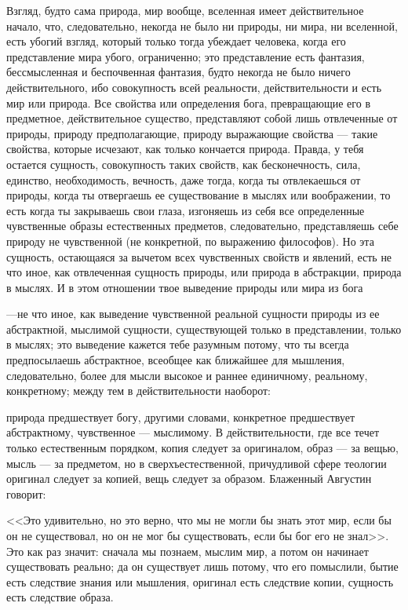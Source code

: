 \documentclass[12pt]{article}
\begin{document}
Взгляд, будто сама природа, мир вообще, вселенная имеет действительное начало, что, следовательно, некогда не было ни природы, ни мира, ни вселенной, есть убогий взгляд, который только тогда убеждает человека, когда его представление мира убого, ограниченно; это представление есть фантазия, бессмысленная и беспочвенная фантазия, будто некогда не было ничего действительного, ибо совокупность всей реальности, действительности и есть мир или природа. Все свойства или определения бога, превращающие его в предметное, действительное существо, представляют собой лишь отвлеченные от природы, природу предполагающие, природу выражающие свойства --- такие свойства, которые исчезают, как только кончается природа. Правда, у тебя остается сущность, совокупность таких свойств, как бесконечность, сила, единство, необходимость, вечность, даже тогда, когда ты отвлекаешься от природы, когда ты отвергаешь ее существование в мыслях или воображении, то есть когда ты закрываешь свои глаза, изгоняешь из себя все определенные чувственные образы естественных предметов, следовательно, представляешь себе природу не чувственной (не конкретной, по выражению философов). Но эта сущность, остающаяся за вычетом всех чувственных свойств и явлений, есть не что иное, как отвлеченная сущность природы, или природа в абстракции, природа в мыслях. И в этом отношении твое выведение природы или мира из бога

---не что иное, как выведение чувственной реальной сущности природы из ее абстрактной, мыслимой сущности, существующей только в представлении, только в мыслях; это выведение кажется тебе разумным потому, что ты всегда предпосылаешь абстрактное, всеобщее как ближайшее для мышления, следовательно, более для мысли высокое и раннее единичному, реальному, конкретному; между тем в действительности наоборот:

природа предшествует богу, другими словами, конкретное предшествует абстрактному, чувственное --- мыслимому. В действительности, где все течет только естественным порядком, копия следует за оригиналом, образ --- за вещью, мысль --- за предметом, но в сверхъестественной, причудливой сфере теологии оригинал следует за копией, вещь следует за образом. Блаженный Августин говорит:

<<Это удивительно, но это верно, что мы не могли бы знать этот мир, если бы он не существовал, но он не мог бы существовать, если бы бог его не знал>>. Это как раз значит: сначала мы познаем, мыслим мир, а потом он начинает существовать реально; да он существует лишь потому, что его помыслили, бытие есть следствие знания или мышления, оригинал есть следствие копии, сущность есть следствие образа.
\end{document}
